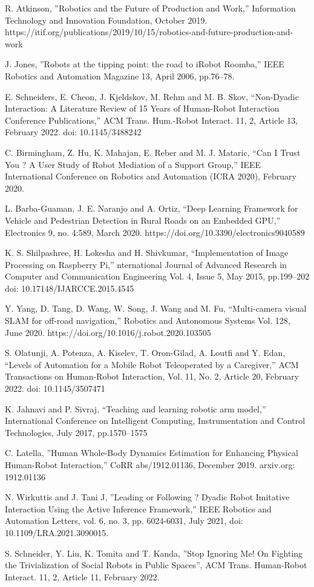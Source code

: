 \documentclass[conference]{IEEEtran}
\begin{document}
\begin{thebibliography}{00}
 R. Atkinson, ''Robotics and the Future of Production and Work,'' Information Technology and Innovation Foundation, October 2019. https://itif.org/publications/2019/10/15/robotics-and-future-production-and-work

 J. Jones, ''Robots at the tipping point: the road to iRobot Roomba,'' IEEE Robotics and Automation Magazine 13, April 2006, pp.76--78.

 E. Schneiders, E. Cheon, J. Kjeldskov, M. Rehm and M. B. Skov, ``Non-Dyadic Interaction: A Literature Review of 15 Years of Human-Robot Interaction Conference Publications,'' ACM Trans. Hum.-Robot Interact. 11, 2, Article 13, February 2022. doi: 10.1145/3488242

 C. Birmingham, Z. Hu, K. Mahajan, E. Reber and M. J. Mataric, ``Can I Trust You ? A User Study of Robot Mediation of a Support Group,'' 	IEEE International Conference on Robotics and Automation (ICRA 2020), February 2020.

 L. Barba-Guaman, J. E. Naranjo and A. Ortiz, ``Deep Learning Framework for Vehicle and Pedestrian Detection in Rural Roads on an Embedded GPU,'' Electronics 9, no. 4:589, March 2020. https://doi.org/10.3390/electronics9040589

 K. S. Shilpashree, H. Lokesha and H. Shivkumar, ``Implementation of Image Processing on Raspberry Pi,'' nternational Journal of Advanced Research in Computer and Communication Engineering Vol. 4, Issue 5, May 2015, pp.199--202 doi: 10.17148/IJARCCE.2015.4545

 Y. Yang, D. Tang, D. Wang, W. Song, J. Wang and M. Fu, ``Multi-camera visual SLAM for off-road navigation,'' Robotics and Autonomous Systems Vol. 128, June 2020. https://doi.org/10.1016/j.robot.2020.103505

 S. Olatunji, A. Potenza, A. Kiselev, T. Oron-Gilad, A. Loutfi and Y. Edan, ``Levels of Automation for a Mobile Robot Teleoperated by a Caregiver,'' ACM Transactions on Human-Robot Interaction, Vol. 11, No. 2, Article 20, February 2022. doi: 10.1145/3507471

 K. Jahnavi and P. Sivraj, ``Teaching and learning robotic arm model,'' International Conference on Intelligent Computing, Instrumentation and Control Technologies, July 2017, pp.1570--1575

 C. Latella, ''Human Whole-Body Dynamics Estimation for Enhancing Physical Human-Robot Interaction,'' CoRR abs/1912.01136, December 2019. arxiv.org: 1912.01136

 N. Wirkuttis and J. Tani J, ''Leading or Following ? Dyadic Robot Imitative Interaction Using the Active Inference Framework,'' IEEE Robotics and Automation Letters, vol. 6, no. 3, pp. 6024-6031, July 2021, doi: 10.1109/LRA.2021.3090015.

 S. Schneider, Y. Liu, K. Tomita and T. Kanda, ''Stop Ignoring Me! On Fighting the Trivialization of Social Robots in Public Spaces'', ACM Trans. Human-Robot Interact. 11, 2, Article 11, February 2022.

\end{thebibliography}
\end{document}
